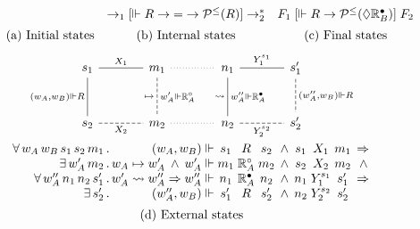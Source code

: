 \documentclass[acmsmall,screen,review,anonymous]{acmart}
\newcommand{\ifr}[1]{\mathrel{[{#1}]}}
\newcommand{\que}{\circ}
\newcommand{\ans}{\bullet}
\begin{document}
\begin{definition}
\begin{figure}[h]
\[\begin{array}{c@{\quad}c@{\quad}c}
      &
      {\rightarrow_1}
      \ifr{\Vdash R \rightarrow {=} \rightarrow \mathcal{P}^\le(R)}
      {\rightarrow_2^*}
      &
      F_1
      \ifr{\Vdash R \rightarrow \mathcal{P}^\le(\Diamond \mathbb{R}_B^\ans)}
      F_2
      \vspace{1.2ex} \\
      \text{(a) Initial states} &
      \text{(b) Internal states} &
      \text{(c) Final states}
    \end{array}
  \]
  \[
    \begin{array}{c}
      \begin{tikzcd}[sep=large,baseline=-3pt]
        s_1 \ar[r, "X_1", dash] \ar[d, "{(w_A,w_B) \Vdash R}"', dash] &
        m_1 \ar[r, dotted, dash] \ar[d, "\mapsto"', "w_A' \Vdash \mathbb{R}_A^\que", dash, dashed] &
        n_1 \ar[r, "Y_1^{s_1}", dash] \ar[d, "\leadsto"', "w_A'' \Vdash \mathbb{R}_A^\ans", dash] &
        s_1' \ar[d, "{(w_A'', w_B) \Vdash R}", dash, dashed]
        \\
        s_2 \ar[r, "X_2"', dash, dashed] &
        m_2 \ar[r, dotted, dash] &
        n_2 \ar[r, "Y_2^{s_2}"', dash, dashed] &
        s_2'
      \end{tikzcd}
      \vspace{0.5ex} \\
      \begin{array}{
          r @{\,.\,} r @{{} \Vdash {}} c@{}c@{}c @{\:\:\wedge\:\:}
                                    c@{}c@{}c @{\:\:} l}
        \forall \, w_A \, w_B \, s_1 \, s_2 \, m_1 & (w_A, w_B) & s_1 & {}\mathrel{R}{} & s_2 &
                        s_1 & {}\mathrel{X_1}{} & m_1 & \Rightarrow \\
        \exists \, w_A' \, m_2 & w_A \mapsto w_A' \:\wedge\: w_A' & m_1 & {}\mathrel{\mathbb{R}_A^\que}{} & m_2 &
                        s_2 & {}\mathrel{X_2}{} & m_2 & \:\wedge\: \\
        \forall \, w_A'' \, n_1 \, n_2 \, s_1' & w_A' \leadsto w_A'' \Rightarrow
            w_A'' & n_1 & {}\mathrel{\mathbb{R}_A^\ans}{} & n_2 &
                        n_1 & {}\mathrel{Y_1^{s_1}}{} & s_1' & \Rightarrow \\
        \exists \, s_2' & (w_A'',w_B) & s_1' & {}\mathrel{R}{} & s_2' &
                        n_2 & {}\mathrel{Y_2^{s_2}}{} & s_2' &
      \end{array}
      \vspace{1.2ex} \\
      \text{(d) External states}
    \end{array}
  \]

\end{figure}
\end{definition}
\end{document}

